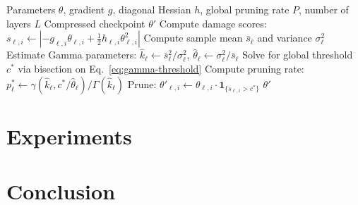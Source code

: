 ﻿\documentclass[11pt]{article}
\begin{document}
\begin{algorithm}[t]
\caption{Distribution-Aware Checkpoint Pruning}
\label{alg:dac}
\begin{algorithmic}[1]
\REQUIRE Parameters $\theta$, gradient $g$, diagonal Hessian $h$, global pruning rate $P$, number of layers $L$
\ENSURE Compressed checkpoint $\theta'$
    \STATE Compute damage scores: $s_{\ell,i} \leftarrow |{-g_{\ell,i}\theta_{\ell,i} + \frac{1}{2}h_{\ell,i}\theta_{\ell,i}^2}|$
    \STATE Compute sample mean $\bar{s}_\ell$ and variance $\sigma_\ell^2$
    \STATE Estimate Gamma parameters: $\hat{k}_\ell \leftarrow \bar{s}_\ell^2 / \sigma_\ell^2$, $\hat{\theta}_\ell \leftarrow \sigma_\ell^2 / \bar{s}_\ell$
\ENDFOR
\STATE Solve for global threshold $c^*$ via bisection on Eq.~\eqref{eq:gamma-threshold}
    \STATE Compute pruning rate: $p_\ell^* \leftarrow \gamma(\hat{k}_\ell, c^*/\hat{\theta}_\ell) / \Gamma(\hat{k}_\ell)$
    \STATE Prune: $\theta'_{\ell,i} \leftarrow \theta_{\ell,i} \cdot \mathbf{1}_{\{s_{\ell,i} > c^*\}}$
\ENDFOR
\RETURN $\theta'$
\end{algorithmic}
\end{algorithm}

\section{Experiments}

\section{Conclusion}

\nolinenumbers

\end{document}
